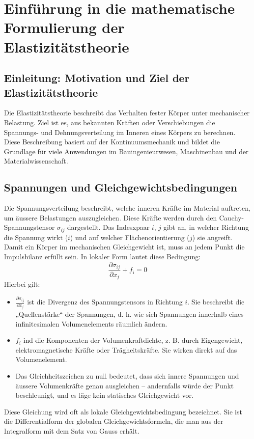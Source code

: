 %
%
%
%
\section{Einführung in die mathematische Formulierung der Elastizitätstheorie}
\subsection{Einleitung: Motivation und Ziel der Elastizitätstheorie}
Die Elastizitätstheorie beschreibt das Verhalten fester Körper unter mechanischer Belastung. 
Ziel ist es, aus bekannten Kräften oder Verschiebungen die Spannungs- und Dehnungsverteilung im Inneren eines Körpers zu berechnen. 
Diese Beschreibung basiert auf der Kontinuumsmechanik und bildet die Grundlage für viele Anwendungen im Bauingenieurwesen, Maschinenbau und der Materialwissenschaft.

\subsection{Spannungen und Gleichgewichtsbedingungen}
Die Spannungsverteilung beschreibt, welche inneren Kräfte im Material auftreten, um äussere Belastungen auszugleichen. 
Diese Kräfte werden durch den Cauchy-Spannungstensor $\sigma_{ij}$ dargestellt. 
Das Indesxpaar $i$, $j$ gibt an, in welcher Richtung die Spannung wirkt ($i$) und auf welcher Flächenorientierung ($j$) sie angreift.
Damit ein Körper im mechanischen Gleichgewicht ist, muss an jedem Punkt die Impulsbilanz erfüllt sein. In lokaler Form lautet diese Bedingung:
\begin{equation}
	\frac{\partial \sigma_{ij}}{\partial x_j} + f_i = 
	0
\end{equation}
Hierbei gilt:
\begin{itemize}
	\item $\frac{\partial \sigma_{ij}}{\partial x_j}$ ist die Divergenz des Spannungstensors in Richtung $i$. 
	Sie beschreibt die „Quellenstärke“ der Spannungen, d. h. wie sich Spannungen innerhalb eines infinitesimalen Volumenelements räumlich ändern.
	\item $f_i$ ind die Komponenten der Volumenkraftdichte, z. B. durch Eigengewicht, elektromagnetische Kräfte oder Trägheitskräfte. Sie wirken direkt auf das Volumenelement.
	\item Das Gleichheitszeichen zu null bedeutet, dass sich innere Spannungen und äussere Volumenkräfte genau ausgleichen – andernfalls würde der Punkt beschleunigt, und es läge kein statisches Gleichgewicht vor.
\end{itemize}
Diese Gleichung wird oft als lokale Gleichgewichtsbedingung bezeichnet. 
Sie ist die Differentialform der globalen Gleichgewichtsformeln, die man aus der Integralform mit dem Satz von Gauss erhält.

